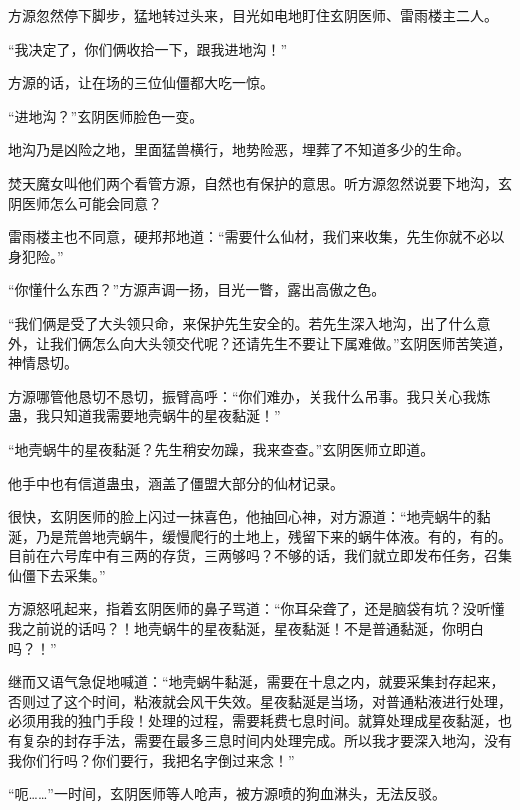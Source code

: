 \begin{this_body}
方源忽然停下脚步，猛地转过头来，目光如电地盯住玄阴医师、雷雨楼主二人。

“我决定了，你们俩收拾一下，跟我进地沟！”

方源的话，让在场的三位仙僵都大吃一惊。

“进地沟？”玄阴医师脸色一变。

地沟乃是凶险之地，里面猛兽横行，地势险恶，埋葬了不知道多少的生命。

焚天魔女叫他们两个看管方源，自然也有保护的意思。听方源忽然说要下地沟，玄阴医师怎么可能会同意？

雷雨楼主也不同意，硬邦邦地道：“需要什么仙材，我们来收集，先生你就不必以身犯险。”

“你懂什么东西？”方源声调一扬，目光一瞥，露出高傲之色。

“我们俩是受了大头领只命，来保护先生安全的。若先生深入地沟，出了什么意外，让我们俩怎么向大头领交代呢？还请先生不要让下属难做。”玄阴医师苦笑道，神情恳切。

方源哪管他恳切不恳切，振臂高呼：“你们难办，关我什么吊事。我只关心我炼蛊，我只知道我需要地壳蜗牛的星夜黏涎！”

“地壳蜗牛的星夜黏涎？先生稍安勿躁，我来查查。”玄阴医师立即道。

他手中也有信道蛊虫，涵盖了僵盟大部分的仙材记录。

很快，玄阴医师的脸上闪过一抹喜色，他抽回心神，对方源道：“地壳蜗牛的黏涎，乃是荒兽地壳蜗牛，缓慢爬行的土地上，残留下来的蜗牛体液。有的，有的。目前在六号库中有三两的存货，三两够吗？不够的话，我们就立即发布任务，召集仙僵下去采集。”

方源怒吼起来，指着玄阴医师的鼻子骂道：“你耳朵聋了，还是脑袋有坑？没听懂我之前说的话吗？！地壳蜗牛的星夜黏涎，星夜黏涎！不是普通黏涎，你明白吗？！”

继而又语气急促地喊道：“地壳蜗牛黏涎，需要在十息之内，就要采集封存起来，否则过了这个时间，粘液就会风干失效。星夜黏涎是当场，对普通粘液进行处理，必须用我的独门手段！处理的过程，需要耗费七息时间。就算处理成星夜黏涎，也有复杂的封存手法，需要在最多三息时间内处理完成。所以我才要深入地沟，没有我你们行吗？你们要行，我把名字倒过来念！”

“呃……”一时间，玄阴医师等人呛声，被方源喷的狗血淋头，无法反驳。

\end{this_body}


